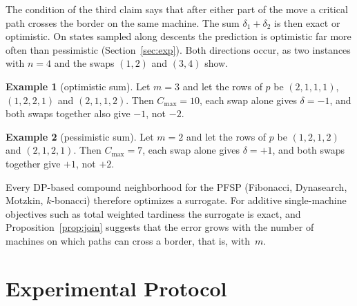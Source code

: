 \documentclass[letterpaper]{article} %
\theoremstyle{definition}
\newtheorem{example}{Example}
\begin{document}
The condition of the third claim says that after either part of the move
a critical path crosses the border on the same machine. The sum $\delta_1+\delta_2$ is then exact or optimistic. On states sampled along descents the
prediction is optimistic far more often than pessimistic
(Section~\ref{sec:exp}). Both directions occur,
as two instances with $n=4$ and the swaps $(1,2)$ and $(3,4)$ show.

\begin{example}[optimistic sum]
Let $m=3$ and let the rows of $p$ be $(2,1,1,1)$, $(1,2,2,1)$ and
$(2,1,1,2)$. Then $C_{\max}=10$, each swap alone gives $\delta=-1$, and
both swaps together also give $-1$, not $-2$.
\end{example}
\begin{example}[pessimistic sum]
Let $m=2$ and let the rows of $p$ be $(1,2,1,2)$ and $(2,1,2,1)$. Then
$C_{\max}=7$, each swap alone gives $\delta=+1$, and both swaps together
give $+1$, not $+2$.
\end{example}

Every DP-based compound neighborhood for the PFSP (Fibonacci, Dynasearch,
Motzkin, $k$-bonacci) therefore optimizes a surrogate. For additive single-machine objectives such as total weighted tardiness the
surrogate is exact, and Proposition~\ref{prop:join} suggests that the
error grows with the number of machines on which paths can cross a
border, that is, with~$m$.

\section{Experimental Protocol}\label{sec:setup}
\end{document}

